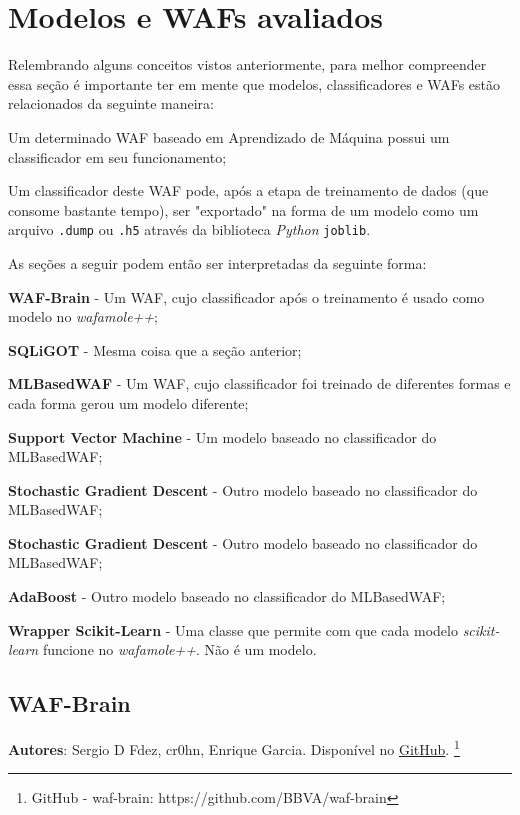 \section{Modelos e WAFs avaliados}

Relembrando alguns conceitos vistos anteriormente, para melhor compreender essa seção é importante ter em mente que modelos, classificadores e WAFs estão relacionados da seguinte maneira: 

\begin{alineas}
\item Um determinado WAF baseado em Aprendizado de Máquina possui um classificador em seu funcionamento;
\item Um classificador deste WAF pode, após a etapa de treinamento de dados (que consome bastante tempo), ser "exportado" na forma de um modelo como um arquivo \verb+.dump+ ou \verb+.h5+ através da biblioteca \textit{Python} \verb+joblib+.
\end{alineas}

As seções a seguir podem então ser interpretadas da seguinte forma:
\begin{alineas}
\item \textbf{WAF-Brain} - Um WAF, cujo classificador após o treinamento é usado como modelo no \textit{wafamole++};
\item \textbf{SQLiGOT} - Mesma coisa que a seção anterior;
\item \textbf{MLBasedWAF} - Um WAF, cujo classificador foi treinado de diferentes formas e cada forma gerou um modelo diferente;
\item \textbf{Support Vector Machine} - Um modelo baseado no classificador do MLBasedWAF;
\item \textbf{Stochastic Gradient Descent} - Outro modelo baseado no classificador do MLBasedWAF;
\item \textbf{Stochastic Gradient Descent} - Outro modelo baseado no classificador do MLBasedWAF;
\item \textbf{AdaBoost} - Outro modelo baseado no classificador do MLBasedWAF;
\item \textbf{Wrapper Scikit-Learn} - Uma classe que permite com que cada modelo \textit{scikit-learn} funcione no \textit{wafamole++}. Não é um modelo.
\end{alineas}
\subsection{WAF-Brain}

\textbf{Autores}: Sergio D Fdez, cr0hn, Enrique Garcia. Disponível no \href{https://github.com/BBVA/waf-brain}{GitHub}. \footnote{GitHub - waf-brain: https://github.com/BBVA/waf-brain}

